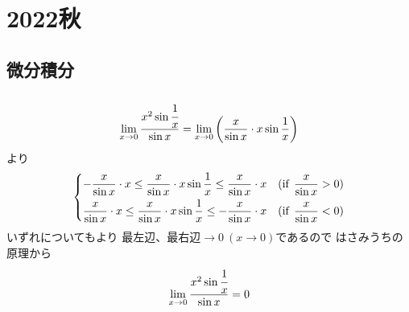 \newpage
\section{2022秋}

\setcounter{yearcounter}{2022}


\subsection{微分積分}
\begin{ans*}
  ${}$
  \begin{gather}
    \lim_{x\to 0}\frac{x^2\sin\cfrac{1}{x}}{\sin x}
    = \lim_{x\to 0}\left(\frac{x}{\sin x}\cdot x\sin\frac{1}{x}\right)
  \end{gather}
  より
  \begin{gather}
    \begin{dcases}
      -\frac{x}{\sin x}\cdot x 
      \leq \frac{x}{\sin x}\cdot x\sin\frac{1}{x} 
      \leq \frac{x}{\sin x}\cdot x
      & (\text{if\:\:} \frac{x}{\sin x} > 0) \\
      \frac{x}{\sin x}\cdot x 
      \leq \frac{x}{\sin x}\cdot x\sin\frac{1}{x} 
      \leq -\frac{x}{\sin x}\cdot x 
      & (\text{if\:\:} \frac{x}{\sin x} < 0)
    \end{dcases}
  \end{gather}
  いずれについてもより
  最左辺、最右辺$\longrightarrow 0\:(x\to 0)$であるので
  はさみうちの原理から
  \begin{gather}
    \lim_{x\to 0}\frac{x^2 \sin \cfrac{1}{x}}{\sin x} = 0
  \end{gather}
\end{ans*}


